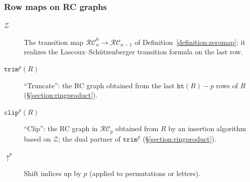 \documentclass[a4paper,fleqn]{cas-sc}
\theoremstyle{definition}
\theoremstyle{remark}
\numberwithin{equation}{subsection}
\newcommand{\shup}{{\uparrow}}
\newcommand{\trm}{\mathtt{trim}}
\newcommand{\zeromap}{\mathcal{Z}}
\newcommand{\hr}{\mathtt{ht}}
\newcommand{\clp}{\mathtt{clip}}
\newcommand{\RC}{\mathcal{RC}}
\begin{document}
\subsubsection*{Row maps on RC graphs}
\begin{description}
\item[$\zeromap$] The transition map $\RC_n^0\to\RC_{n-1}$ of Definition~\ref{definition:zeromap}; it realizes the Lascoux--Sch\"utzenberger transition formula on the last row.
\item[$\trm^p(R)$] ``Truncate'': the RC graph obtained from the last $\hr(R)-p$ rows of $R$ (\S\ref{section:ringproduct}).
\item[$\clp^p(R)$] ``Clip'': the RC graph in $\RC_p$ obtained from $R$ by an insertion algorithm based on $\zeromap$; the dual partner of $\trm^p$ (\S\ref{section:ringproduct}).
\item[$\shup^p$] Shift indices up by $p$ (applied to permutations or letters).
\end{description}
\end{document}
